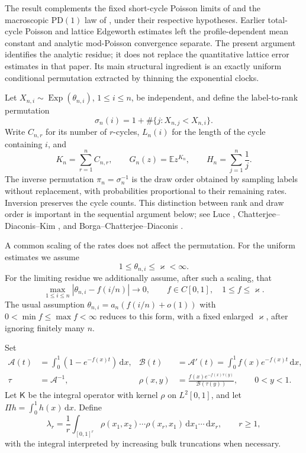 \documentclass[11pt]{article}
\numberwithin{equation}{section}
\theoremstyle{definition}
\theoremstyle{remark}
\newcommand{\E}{\mathbb E}
\newcommand{\dd}{\,\mathrm d}
\newcommand{\Exp}{\operatorname{Exp}}
\newcommand{\cA}{\mathcal A}
\newcommand{\cB}{\mathcal B}
\newcommand{\Kop}{\mathsf K}
\begin{document}
The result complements the fixed short-cycle Poisson limits of \cite{LongMicro}
and the macroscopic $\mathrm{PD}(1)$ law of \cite{LongMacro}, under their respective
hypotheses. Earlier total-cycle Poisson and lattice Edgeworth estimates
\cite{LongTotal} left the profile-dependent mean constant and analytic
mod-Poisson convergence separate. The present argument identifies the analytic
residue; it does not replace the quantitative lattice error estimates in that
paper. Its main structural ingredient is an exactly uniform conditional
permutation extracted by thinning the exponential clocks.

Let $X_{n,i}\sim\Exp(\theta_{n,i})$, $1\le i\le n$, be independent, and define the label-to-rank permutation
\[
 \sigma_n(i)=1+\#\{j:X_{n,j}<X_{n,i}\}.
\]
Write $C_{n,r}$ for its number of $r$-cycles, $L_n(i)$ for the length of the cycle containing $i$, and
\[
 K_n=\sum_{r=1}^n C_{n,r},\qquad
 G_n(z)=\E z^{K_n},\qquad H_n=\sum_{j=1}^n\frac1j.
\]
The inverse permutation $\pi_n=\sigma_n^{-1}$ is the draw order obtained by sampling labels without replacement, with probabilities proportional to their remaining rates. Inversion preserves the cycle counts. This distinction between rank and draw order is important in the sequential argument below; see Luce \cite{Luce}, Chatterjee--Diaconis--Kim \cite{CDK}, and Borga--Chatterjee--Diaconis \cite{BCD}.

A common scaling of the rates does not affect the permutation. For the uniform estimates we assume
\begin{equation}\label{eq:comparable}
 1\le\theta_{n,i}\le\varkappa<\infty.
\end{equation}
For the limiting residue we additionally assume, after such a scaling, that
\begin{equation}\label{eq:profile}
 \max_{1\le i\le n}|\theta_{n,i}-f(i/n)|\longrightarrow0,
 \qquad f\in C[0,1],\quad 1\le f\le\varkappa.
\end{equation}
The usual assumption $\theta_{n,i}=a_n(f(i/n)+o(1))$ with $0<\min f\le\max f<\infty$ reduces to this form, with a fixed enlarged $\varkappa$, after ignoring finitely many $n$.

Set
\begin{align}
 \cA(t)&=\int_0^1(1-e^{-f(x)t})\dd x,
 &\cB(t)&=\cA'(t)=\int_0^1 f(x)e^{-f(x)t}\dd x,\label{eq:profile-transforms}\\
 \tau&=\cA^{-1},
 &\rho(x,y)&=\frac{f(x)e^{-f(x)\tau(y)}}{\cB(\tau(y))},\qquad 0<y<1.\label{eq:rho}
\end{align}
Let $\Kop$ be the integral operator with kernel $\rho$ on $L^2[0,1]$, and let $\Pi h=\int_0^1h(x)\dd x$. Define
\begin{equation}\label{eq:lambda}
 \lambda_r=\frac1r\int_{[0,1]^r}\rho(x_1,x_2)\cdots\rho(x_r,x_1)
 \dd x_1\cdots\dd x_r,
 \qquad r\ge1,
\end{equation}
with the integral interpreted by increasing bulk truncations when necessary.
\end{document}
